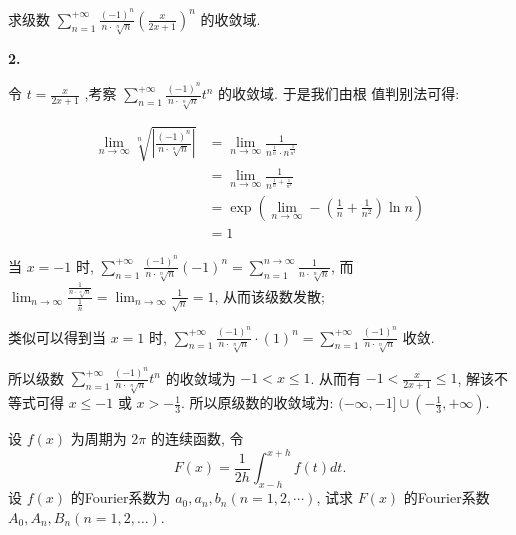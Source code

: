 \documentclass[12pt]{article}
\newenvironment{solution}[2][Solution]{\begin{trivlist}
\item[\hskip \labelsep {\bfseries #1}]}{\end{trivlist}}
\newenvironment{problem}[2][Problem]{\begin{trivlist}
\item[\hskip \labelsep {\bfseries #1}\hskip \labelsep {\bfseries #2.}]}{\end{trivlist}}
\begin{document}
\vspace{3cm}

\begin{problem}{2}
    求级数 $\displaystyle \sum_{n=1}^{+\infty} \frac{(-1)^n}{n \cdot \sqrt[n]{n}} (\frac{x}{2x+1})^n$ 的收敛域.
\end{problem}

\begin{solution}{2} \textbf{2.}

    令 $\displaystyle t = \frac{x}{2x+1}$ ,考察 $\displaystyle \sum_{n=1}^{+ \infty} \frac{(-1)^n}{n \cdot \sqrt[n]{n}} t^n $ 的收敛域. 于是我们由根
    值判别法可得:

    \[
        \begin{aligned}
            \lim_{n \to \infty} \sqrt[n]{\left | \frac{(-1)^n}{n \cdot \sqrt[a]{n}} \right |} &= \lim_{n \to \infty} \frac{1}{n^{\frac{1}{n}}
            \cdot n^{\frac{1}{n^2}}}  \\
            &= \lim_{n \to \infty} \frac{1}{n^{\frac{1}{n} + \frac{1}{n^2}}} \\
            &= \exp(\lim_{n \to \infty} -(\frac{1}{n} + \frac{1}{n^2}) \ln n) \\
            &= 1
        \end{aligned}
    \]

    当 $ x = -1 $ 时, $ \displaystyle \sum_{n=1}^{+ \infty} \frac{(-1)^n}{n \cdot \sqrt[n]{n}} (-1)^n = \sum_{n=1}^{n \to \infty} \frac{1}{n \cdot \sqrt[n]{n}} $,
    而 $ \displaystyle \lim_{n \to \infty} \frac{\frac{1}{n \cdot \sqrt[n]{n}}}  {\frac{1}{n}} = \lim_{n \to \infty} \frac{1}{\sqrt{n}} = 1 $, 从而该级数发散;

    类似可以得到当 $ x = 1 $ 时, $ \displaystyle\sum_{n=1}^{+\infty} \frac{(-1)^n}{n \cdot \sqrt[n]{n}} \cdot (1)^n = \sum_{n=1}^{+\infty}  \frac{(-1)^n}{n \cdot 
    \sqrt[n]{n}} $ 收敛. 
    
    所以级数 $ \displaystyle\sum_{n=1}^{+\infty} \frac{(-1)^n}{n \cdot \sqrt[n]{n}} t^n $ 的收敛域为 $ -1 < x \leq 1 $. 从而有
    $ -1 < \frac{x}{2x+1} \leq 1 $, 解该不等式可得 $ x \leq -1 $ 或 $ x > -\frac{1}{3} $. 所以原级数的收敛域为: $ (-\infty, -1] \cup (-\frac{1}{3}, +\infty)$.

\end{solution}

\vspace{3cm}



\begin{problem}{3}
    设 $f(x)$ 为周期为 $2\pi$ 的连续函数, 令
    \[
        F(x) = \frac{1}{2h} \int_{x-h}^{x+h} f(t) dt.  
    \]
    设 $f(x)$ 的Fourier系数为 $a_0, a_n, b_n(n = 1, 2, \cdots)$, 试求 $F(x)$ 的Fourier系数 $A_0, A_n, B_n(n = 1, 2, \dots)$.


\end{problem}
\end{document}
